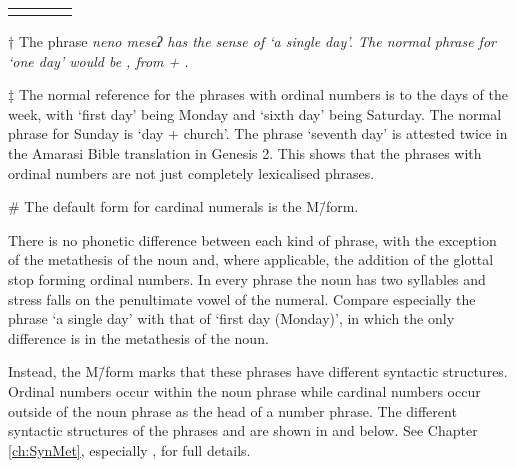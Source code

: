 \begin{table}[ht]
\begin{threeparttable}[b]
\begin{tabular}{llll}
		\lspbottomrule
		\end{tabular}
			\begin{tablenotes}
				\item [†]
					The phrase \it{neno meseʔ} has the sense of `a single day'.
					The normal phrase for `one day' would be ,
					from  + .
				\item [‡]
					The normal reference for the phrases with ordinal numbers
					is to the days of the week, with  `first day'
					being Monday and  `sixth day' being Saturday.
					The normal phrase for Sunday is  `day + church'.
					The phrase  `seventh day' is attested twice
					in the Amarasi Bible translation in Genesis 2.
					This shows that the phrases with ordinal numbers
					are not just completely lexicalised phrases.
				\item [\#] The default form for cardinal numerals is the M\=/form.
			\end{tablenotes}
		\end{threeparttable}
\end{table}

There is no phonetic difference between each kind of phrase,
with the exception of the metathesis of the noun
and, where applicable, the addition of the glottal stop forming ordinal numbers.
In every phrase the noun has two syllables
and stress falls on the penultimate vowel of the numeral.
Compare especially the phrase  `a single day'
with that of  `first day (Monday)',
in which the only difference is in the metathesis of the noun.

Instead, the M\=/form marks that these phrases have different syntactic structures.
Ordinal numbers occur within the noun phrase
while cardinal numbers occur outside of the noun phrase
as the head of a number phrase.
The different syntactic structures of the phrases
 and 
are shown in  and  below.
See Chapter \ref{ch:SynMet}, especially , for full details.

\begin{multicols}{2}
	\begin{exe} \let\eachwordone=\textnormal \let\eachwordtwo=\ve
		\label{ex2:NenoMeseq}
		\label{ex2:NeonMeseq}
	\end{exe}
\end{multicols}

